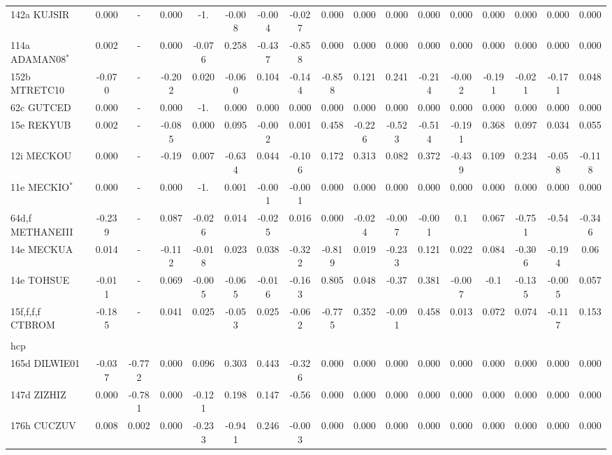 \documentclass[preprint]{iucr}              %
\begin{document}
\begin{landscape}
\begin{table}
\begin{tabular}{lcccccccccccccccc}
142a KUJSIR & 0.000 & - & 0.000 & -1. & -0.008 & -0.004 & -0.027 & 0.000 & 0.000 & 0.000 & 0.000 & 0.000 & 0.000 & 0.000 & 0.000 & 0.000 \\
114a ADAMAN08$^*$ & 0.002 & - & 0.000 & -0.076 & 0.258 & -0.437 & -0.858 & 0.000 & 0.000 & 0.000 & 0.000 & 0.000 & 0.000 & 0.000 & 0.000 & 0.000 \\
152b MTRETC10 & -0.070 & -  & -0.202 & 0.020 & -0.060 & 0.104 & -0.144 & -0.858 & 0.121 & 0.241 & -0.214 & -0.002 & -0.191 & -0.021 & -0.171 & 0.048 \\
62c GUTCED & 0.000 & - & 0.000 & -1. & 0.000 & 0.000 & 0.000 & 0.000 & 0.000 & 0.000 & 0.000 & 0.000 & 0.000 & 0.000 & 0.000 & 0.000 \\
15e REKYUB & 0.002 & - & -0.085 & 0.000 & 0.095 & -0.002 & 0.001 & 0.458 & -0.226 & -0.523 & -0.514 & -0.191 & 0.368 & 0.097 & 0.034 & 0.055 \\
12i MECKOU & 0.000 & - & -0.19 & 0.007 & -0.634 & 0.044 & -0.106 & 0.172 & 0.313 & 0.082 & 0.372 & -0.439 & 0.109 & 0.234 & -0.058 & -0.118 \\
11e MECKIO$^*$ & 0.000 & - & 0.000 & -1. & 0.001 & -0.001 & -0.001 & 0.000 & 0.000 & 0.000 & 0.000 & 0.000 & 0.000 & 0.000 & 0.000 & 0.000 \\
64d,f METHANEIII & -0.239 & - & 0.087 & -0.026 & 0.014 & -0.025 & 0.016 & 0.000 & -0.024 & -0.007 & -0.001 & 0.1 & 0.067 & -0.751 & -0.54 & -0.346 \\
14e MECKUA & 0.014 & - & -0.112 & -0.018 & 0.023 & 0.038 & -0.322 & -0.819 & 0.019 & -0.233 & 0.121 & 0.022 & 0.084 & -0.306 & -0.194 & 0.06 \\
14e TOHSUE & -0.011 & - & 0.069 & -0.005 & -0.065 & -0.016 & -0.163 & 0.805 & 0.048 & -0.37 & 0.381 & -0.007 & -0.1 & -0.135 & -0.005 & 0.057 \\
15f,f,f,f CTBROM & -0.185 & - & 0.041 & 0.025 & -0.053 & 0.025 & -0.062 & -0.775 & 0.352 & -0.091 & 0.458 & 0.013 & 0.072 & 0.074 & -0.117 & 0.153 \\
\\
hcp\\
165d DILWIE01 & -0.037 & -0.772 & 0.000  & 0.096 & 0.303 & 0.443 & -0.326 & 0.000  & 0.000  & 0.000  & 0.000  & 0.000  & 0.000  & 0.000  & 0.000 & 0.000 \\
147d ZIZHIZ & 0.000 & -0.781 & 0.000 & -0.121 & 0.198 & 0.147 & -0.56 & 0.000 & 0.000 & 0.000 & 0.000 & 0.000 & 0.000 & 0.000 & 0.000 & 0.000 \\
176h CUCZUV & 0.008 & 0.002 & 0.000  & -0.233 & -0.941 & 0.246 & -0.003 & 0.000  & 0.000  & 0.000  & 0.000  & 0.000  & 0.000  & 0.000  & 0.000  & 0.000  \\

\end{tabular}
\end{table}
\end{landscape}
\end{document}
